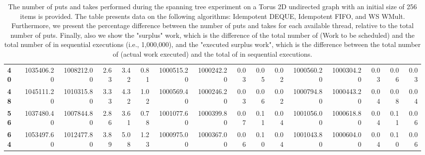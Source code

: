 \begin{table}[!ht]
{\begin{tabular}{lrrrrrrrrrrrrrrr}
\textbf{40} &       1035406.20 & 1008212.00 &           2.63 &        3.42 &                 0.81 &      1000515.20 & 1000242.20 &           0.03 &        0.05 &                 0.02 & 1000560.20 & 1000304.20 &           0.03 &        0.06 &                 0.03 \\
\textbf{48} &       1045111.20 & 1010315.80 &           3.33 &        4.32 &                 1.02 &      1000569.40 & 1000246.20 &           0.03 &        0.06 &                 0.02 & 1000794.80 & 1000443.20 &           0.04 &        0.08 &                 0.04 \\
\textbf{56} &       1037480.40 & 1007844.80 &           2.86 &        3.61 &                 0.78 &      1001077.60 & 1000399.80 &           0.07 &        0.11 &                 0.04 & 1001056.00 & 1000618.80 &           0.04 &        0.11 &                 0.06 \\
\textbf{64} &       1053497.60 & 1012477.80 &           3.89 &        5.08 &                 1.23 &      1000975.00 & 1000367.00 &           0.06 &        0.10 &                 0.04 & 1001043.80 & 1000604.00 &           0.04 &        0.10 &                 0.06 \\
\bottomrule
\end{tabular}}
\label{difference-Torus_2D_undirected-256-IDEMPOTENT_DEQUE-IDEMPOTENT_FIFO-WS_NC_MULT_OPT}
\caption{The number of puts and takes performed during the
    spanning tree experiment on a Torus 2D undirected graph with an initial size
    of 256 items is provided. The table presents data on the
    following algorithms: Idempotent DEQUE, Idempotent FIFO, and
    WS WMult. Furthermore, we present the percentage difference
    between the number of puts and takes for each available thread,
    relative to the total number of puts. Finally, also we show the
    "surplus" work, which is the difference of the total number of
    \Puts (Work to be scheduled) and the total number of \Puts in
    sequential executions (i.e., 1,000,000), and the "executed surplus
    work", which is the difference between the total number of \Takes
    (actual work executed) and the total of \Takes in sequential
    executions.}
\end{table}
